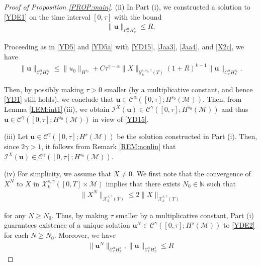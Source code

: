 \documentclass[letterpaper, 11pt,  reqno]{amsart}
\newcommand{\1}{\hspace{0.5mm}\text{I}\hspace{0.5mm}}
\newcommand{\I}{\mathcal{I}}
\newcommand{\noi}{\noindent}
\newcommand{\CC}{\mathcal{C}}
\newcommand{\al}{\alpha}
\newcommand{\g}{\gamma}
\newcommand{\M}{\mathcal{M}}
\newcommand{\N}{\mathbb{N}}
\newcommand{\cC}{\mathcal{C}}
\newcommand{\cX}{\mathcal{X}}
\newcommand{\cY}{\mathcal{Y}}
\newcommand{\uu}{\mathbf{u}}
\numberwithin{equation}{section}
\numberwithin{theorem}{section}
\begin{document}
\begin{proof}[Proof of Proposition \ref{PROP:main}]
\noi
(ii)
In Part (i), we constructed a solution to \eqref{YDE1}
on the time interval $[0, \tau]$ with the bound 
\begin{align*}
\| \uu\|_{\CC^\al_\tau H^s_x} \le R.
\end{align*}

\noi
Proceeding as in \eqref{YD5}  and \eqref{YD5a} with 
\eqref{YD15}, 
\eqref{Jaa3},  \eqref{Jaa4}, 
and \eqref{X2c}, 
we have
\begin{align*}
\| \uu\|_{\CC^\al_\tau H^{s_0}_x} \le  \|u_0\|_{H^{s_0}} 
+ C \tau^{\g- \al}
\|X\|_{\cY^{s, s_0, \g}_k(T)}
(1+ R)^{k-1} \| \uu\|_{C^\al_\tau H^{s_0}_x}.
\end{align*}

\noi
Then, by possibly making $\tau > 0$ smaller (by a multiplicative constant, and hence \eqref{YD1}
still holds), 
we conclude that 
$\uu \in  \CC^\al([0, \tau]; H^{s_0}(\M))$.
Then, from 
Lemma \ref{LEM:int1}\,(iii), 
we obtain 
 $\I^X(\uu) \in 
 \CC^\g([0, \tau]; H^{s_0}(\M))$
 and thus
  $\uu \in 
 \CC^\g([0, \tau]; H^{s_0}(\M))$
 in view of \eqref{YD15}.





\medskip

\noi
(iii)
Let   $\uu \in \cC^\g([0, \tau]; H^s(\M))$ be the solution constructed in Part (i).
Then, since $2\g > 1$, 
it follows from 
Remark \ref{REM:nonlin}
that 
 $\I^X(\uu) \in \cC^\g([0, \tau]; H^{s_0}(\M))$.





\medskip

\noi
(iv)
For simplicity, we assume that $X\ne 0$.
We first note that the convergence of $X^N$ to $X$ in 
$ \cX^{s, \g}_k([0, T]\times \M)$ implies
that there exists $N_0 \in \N$ such that 
\begin{align}\|X^N\|_{\cX^{s, \g}_k(T)} \le
2 \|X\|_{\cX^{s, \g}_k(T)} 
\label{YDE3a}
\end{align}

\noi
for any $N \ge N_0$.
Thus, by making $\tau$ smaller by a multiplicative constant, 
Part (i) guarantees existence of 
a unique solution $\uu^N \in \CC^\g([0, \tau]; H^s(\M))$
to \eqref{YDE2} for each $N \ge N_0$.
Moreover, we have 
\begin{align}
\|\uu^N \|_{\CC^\al_\tau H^s_x} , \|\uu \|_{\CC^\al_\tau H^s_x} \le R
\label{YDE3b}
\end{align}


\end{proof}
\end{document}
